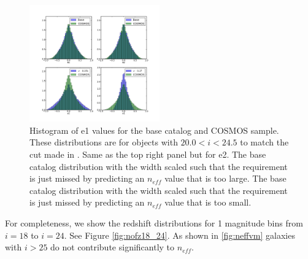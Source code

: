 \documentclass[]{article}
\begin{document}
\begin{figure}[th]
\centering
\includegraphics[width=0.5\textwidth]{validation_figures/e_hist.png}
\caption{Histogram of e1 values for the base catalog and COSMOS sample.  These distributions are for objects with $20.0 < i < 24.5$ to match
the cut made in \citet{chang}.
Same as the top right panel but for e2.
The base catalog distribution with the width scaled such that the requirement is just missed by predicting an $n_{eff}$ value that is too large.
The base catalog distribution with the width scaled such that the requirement is just missed by predicting an $n_{eff}$ value that is too small.
\label{e_hist}}
\end{figure}

For completeness, we show the redshift distributions for 1 magnitude bins from $i=18$ to $i=24$.  See Figure \ref{fig:nofz18_24}.  As shown in \ref{fig:neffvm}
galaxies with $i > 25$ do not contribute significantly to $n_{eff}$. 
\end{document}

